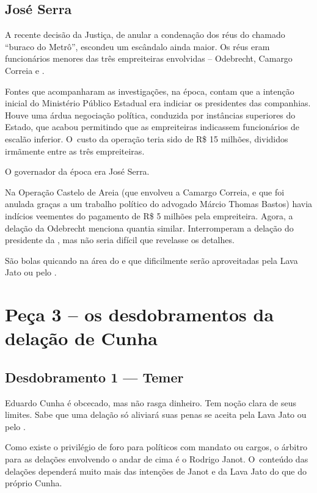 \subsection{José Serra}

A recente decisão da Justiça, de anular a condenação dos réus do chamado
``buraco do Metrô'', escondeu um escândalo ainda maior. Os réus eram
funcionários menores das três empreiteiras envolvidas -- Odebrecht,
Camargo Correia e .

Fontes que acompanharam as investigações, na época, contam que a
intenção inicial do Ministério Público Estadual era indiciar os
presidentes das companhias. Houve uma árdua negociação política,
conduzida por instâncias superiores do Estado, que acabou permitindo que
as empreiteiras indicassem funcionários de escalão inferior. O~custo da
operação teria sido de R\$ 15 milhões, divididos irmãmente entre as três
empreiteiras.

O governador da época era José Serra.

Na Operação Castelo de Areia (que envolveu a Camargo Correia, e que foi
anulada graças a um trabalho político do advogado Márcio Thomas Bastos)
havia indícios veementes do pagamento de R\$ 5 milhões pela empreiteira.
Agora, a delação da Odebrecht menciona quantia similar. Interromperam a
delação do presidente da , mas não seria difícil que revelasse os
detalhes.

São bolas quicando na área do  e que dificilmente serão aproveitadas
pela Lava Jato ou pelo .

\section{Peça 3 -- os desdobramentos da delação de Cunha}

\subsection{Desdobramento 1 --- Temer}

Eduardo Cunha é obcecado, mas não rasga dinheiro. Tem noção clara de
seus limites. Sabe que uma delação só aliviará suas penas se aceita pela
Lava Jato ou pelo .

Como existe o privilégio de foro para políticos com mandato ou cargos, o
árbitro para as delações envolvendo o andar de cima é o  Rodrigo
Janot. O~conteúdo das delações dependerá muito mais das intenções de
Janot e da Lava Jato do que do próprio Cunha.

